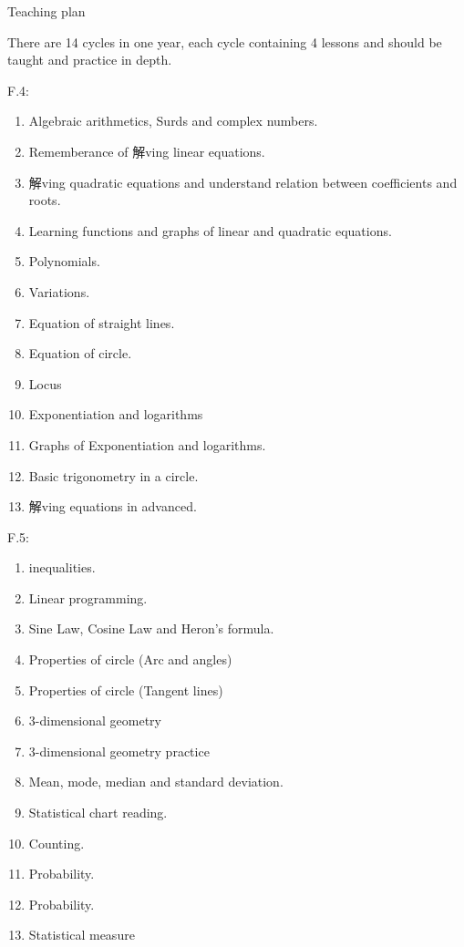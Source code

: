 \documentclass{article}
\begin{document}
    \begin{center}
        Teaching plan
    \end{center}

    There are 14 cycles in one year, each cycle containing 4 lessons and should be taught and practice in depth.

    \noindent F.4:\begin{enumerate}
        \item Algebraic arithmetics, Surds and complex numbers.
        \item Rememberance of 解ving linear equations.
        \item 解ving quadratic equations and understand relation between coefficients and roots.
        \item Learning functions and graphs of linear and quadratic equations.
        \item Polynomials.
        \item Variations.
        \item Equation of straight lines.
        \item Equation of circle.
        \item Locus
        \item Exponentiation and logarithms
        \item Graphs of Exponentiation and logarithms.
        \item Basic trigonometry in a circle.
        \item 解ving equations in advanced.
    \end{enumerate}

    \noindent F.5:\begin{enumerate}
        \item inequalities.
        \item Linear programming.
        \item Sine Law, Cosine Law and Heron's formula.
        \item Properties of circle (Arc and angles)
        \item Properties of circle (Tangent lines)
        \item 3-dimensional geometry
        \item 3-dimensional geometry practice
        \item Mean, mode, median and standard deviation.
        \item Statistical chart reading.
        \item Counting.
        \item Probability.
        \item Probability.
        \item Statistical measure
    \end{enumerate}
\end{document}
